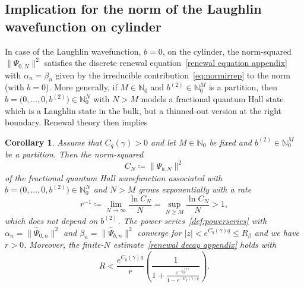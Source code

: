 \documentclass[letterpaper, DIV=17]{scrartcl}
\newtheorem{cor}[theorem]{Corollary}
\numberwithin{equation}{section}
\theoremstyle{definition}
\begin{document}
		\subsection{Implication for the norm of the Laughlin wavefunction on cylinder}
		In case of the Laughlin wavefunction, $ b = 0 $, on the cylinder, the norm-squared $ \| \Psi_{0,N}\|^2 $ satisfies the discrete renewal equation~\eqref{renewal equation appendix} with $ \alpha_n = \beta_n $
		given by the irreducible contribution~\eqref{eq:normirrep}  to the norm (with $ b = 0 $). 
		More generally, if $ M \in \mathbb{N}_0 $ and $ b^{(2)} \in \mathbb{N}_0^M $ is a partition, then $ b = \big(0 , \dots , 0 , b^{(2)} \big) \in \mathbb{N}_0^N $ with $ N > M $ models a fractional quantum Hall state 
		which is a Laughlin state in the bulk, but a thinned-out version at the right boundary. Renewal theory then implies
		\begin{cor}
		Assume that $C_q(\gamma)>0$ and let $ M \in \mathbb{N}_0 $ be fixed and $ b^{(2)} \in \mathbb{N}_0^M $  be a partition. Then the norm-squared 
		$$ C_N \coloneqq \big\| \Psi_{b,N} \big\|^2 $$ 
		of the fractional quantum Hall wavefunction associated with $ b = \big(0 , \dots , 0 , b^{(2)} \big) \in \mathbb{N}_0^N $ and $ N > M $ grows exponentially  with a rate
		\begin{equation}\label{eq:pressure}
		r^{-1} \coloneqq \lim_{N\to \infty} \frac{\ln C_N}{N} = \sup_{N \geq M} \frac{\ln C_N}{N} > 1,
		\end{equation}
		which does not depend on $b^{(2)}$. 
		The power series~\eqref{def:powerseries} with $ \alpha_n = \| \widehat \Psi_{0,n} \|^2 $ and $ \beta_n = \| \widehat \Psi_{b,n} \|^2 $
		converge for $ | z | < e^{C_q(\gamma) q} \leq R_\beta $ and we have $ r > 0 $. 
		Moreover, the finite-$ N $ estimate~\eqref{renewal decay appendix} holds with
		\begin{equation}
			R< \frac{e^{C_q(\gamma)q}}{ r} \left(\frac{1}{1+\frac{e^{-b^{(2)}_N}}{1-e^{-C_q(\gamma)q}}}\right).
		\end{equation}
		\end{cor}
\end{document}
